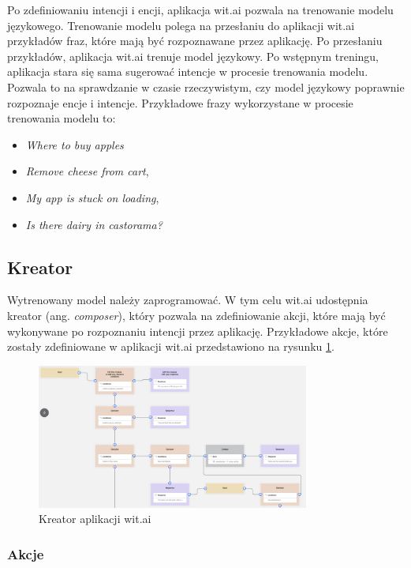 Po zdefiniowaniu intencji i encji, aplikacja wit.ai pozwala na trenowanie modelu językowego. Trenowanie modelu polega na przesłaniu do aplikacji wit.ai przykładów fraz, które mają być rozpoznawane przez aplikację. Po przesłaniu przykładów, aplikacja wit.ai trenuje model językowy. Po wstępnym treningu, aplikacja stara się sama sugerować intencje w procesie trenowania modelu. Pozwala to na sprawdzanie w czasie rzeczywistym, czy model językowy poprawnie rozpoznaje encje i intencje. Przykładowe frazy wykorzystane w procesie trenowania modelu to:
\begin{itemize}
    \item \textit{Where to buy apples}
    \item \textit{Remove cheese from cart},
    \item \textit{My app is stuck on loading},
    \item \textit{Is there dairy in castorama?}
\end{itemize}

\subsection{Kreator}

Wytrenowany model należy zaprogramować. W tym celu wit.ai udostępnia kreator (ang. \textit{composer}), który pozwala na zdefiniowanie akcji, które mają być wykonywane po rozpoznaniu intencji przez aplikację. Przykładowe akcje, które zostały zdefiniowane w aplikacji wit.ai przedstawiono na rysunku \ref{fig:wit_ai_composer}.

\begin{figure}[H]
    \centering
    \includegraphics[width=0.8\textwidth]{images/witai_composer.png}
    \caption{Kreator aplikacji wit.ai}
    \label{fig:wit_ai_composer}
\end{figure}

\subsubsection{Akcje}

